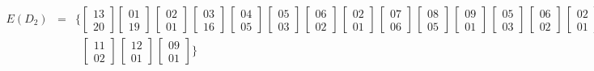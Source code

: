 \[\begin{array}{rcl}
E(D_2) &=& \{ \begin{bmatrix} 13 \\ 20 \end{bmatrix} \begin{bmatrix} 01 \\ 19 \end{bmatrix}\,\begin{bmatrix} 02 \\ 01 \end{bmatrix}\,\begin{bmatrix} 03 \\ 16 \end{bmatrix}\,\begin{bmatrix} 04 \\ 05 \end{bmatrix}\,\begin{bmatrix} 05 \\ 03 \end{bmatrix}\,\begin{bmatrix} 06 \\ 02 \end{bmatrix}\,\begin{bmatrix} 02 \\ 01 \end{bmatrix}\,\begin{bmatrix} 07 \\ 06 \end{bmatrix}\,\begin{bmatrix} 08 \\ 05 \end{bmatrix}\,\begin{bmatrix} 09 \\ 01 \end{bmatrix}\,\begin{bmatrix} 05 \\ 03 \end{bmatrix}\,\begin{bmatrix} 06 \\ 02 \end{bmatrix}\,\begin{bmatrix} 02 \\ 01 \end{bmatrix}\,\begin{bmatrix} 10 \\ 03 \end{bmatrix}\,\\[1em] & & \;\;\begin{bmatrix} 11 \\ 02 \end{bmatrix}\,\begin{bmatrix} 12 \\ 01 \end{bmatrix}\,\begin{bmatrix} 09 \\ 01 \end{bmatrix} \} \\[1.8em]

\end{array}\]
